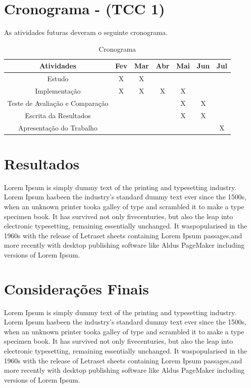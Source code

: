\documentclass[
	12pt,				%
	openright,			%
	oneside,			%
	a4paper,			%
	chapter=TITLE,		%
	english,			%
	brazil,				%
	]{abntex2}
\begin{document}
\chapter{Cronograma - (TCC 1)} 
As atividades futuras deveram o seguinte cronograma.

\begin{table}[h]
\centering
\caption{Cronograma}
\vspace{0.5cm}
\begin{tabular}{c|c|c|c|c|c|c}
\label{tabela-coleta}

Atividades&Fev&Mar&Abr&Mai&Jun&Jul\\
\hline 
Estudo  &X&X&&&\\
Implementação &X&X&X&X&\\
Teste de Avaliação e Comparação  &&&&X&X  \\
Escrita da Resultados  &&&&X&X& \\
Apresentação do Trabalho &&&&&&X   
\end{tabular}
\end{table}


\chapter{Resultados}
Lorem Ipsum is simply dummy text of the printing and typesetting industry. Lorem Ipsum hasbeen the industry’s standard dummy text ever since the 1500s, when an unknown printer tooka galley of type and scrambled it to make a type specimen book. It has survived not only fivecenturies, but also the leap into electronic typesetting, remaining essentially unchanged. It waspopularised in the 1960s with the release of Letraset sheets containing Lorem Ipsum passages,and more recently with desktop publishing software like Aldus PageMaker including versions of Lorem Ipsum.


\chapter{Considerações Finais}
Lorem Ipsum is simply dummy text of the printing and typesetting industry. Lorem Ipsum hasbeen the industry’s standard dummy text ever since the 1500s, when an unknown printer tooka galley of type and scrambled it to make a type specimen book. It has survived not only fivecenturies, but also the leap into electronic typesetting, remaining essentially unchanged. It waspopularised in the 1960s with the release of Letraset sheets containing Lorem Ipsum passages,and more recently with desktop publishing software like Aldus PageMaker including versions of Lorem Ipsum.



\printindex
\end{document}
